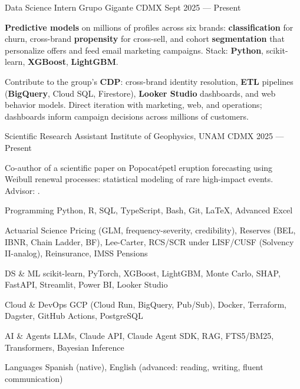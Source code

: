\documentclass[10pt, letterpaper]{awesome-cv}
\begin{document}
\begin{cventries}

  \cventry
    {Data Science Intern}
    {Grupo Gigante}
    {CDMX}
    {Sept 2025 — Present}
    {
      \begin{cvitems}
        \item {\textbf{Predictive models} on millions of profiles across six brands: \textbf{classification} for churn, cross-brand \textbf{propensity} for cross-sell, and cohort \textbf{segmentation} that personalize offers and feed email marketing campaigns. Stack: \textbf{Python}, scikit-learn, \textbf{XGBoost}, \textbf{LightGBM}.}
        \item {Contribute to the group's \textbf{CDP}: cross-brand identity resolution, \textbf{ETL} pipelines (\textbf{BigQuery}, Cloud SQL, Firestore), \textbf{Looker Studio} dashboards, and web behavior models. Direct iteration with marketing, web, and operations; dashboards inform campaign decisions across millions of customers.}
      \end{cvitems}
    }

  \cventry
    {Scientific Research Assistant }
    {Institute of Geophysics, UNAM}
    {CDMX}
    {2025 — Present}
    {
      \begin{cvitems}
        \item {Co-author of a scientific paper on Popocatépetl eruption forecasting using Weibull renewal processes: statistical modeling of rare high-impact events. Advisor: .}
      \end{cvitems}
    }

\end{cventries}


\begin{cvskills}
  \cvskill
    {Programming}
    {Python, R, SQL, TypeScript, Bash, Git, \LaTeX, Advanced Excel}

  \cvskill
    {Actuarial Science}
    {Pricing (GLM, frequency-severity, credibility), Reserves (BEL, IBNR, Chain Ladder, BF), Lee-Carter, RCS/SCR under LISF/CUSF (Solvency II-analog), Reinsurance, IMSS Pensions}

  \cvskill
    {DS \& ML}
    {scikit-learn, PyTorch, XGBoost, LightGBM, Monte Carlo, SHAP, FastAPI, Streamlit, Power BI, Looker Studio}

  \cvskill
    {Cloud \& DevOps}
    {GCP (Cloud Run, BigQuery, Pub/Sub), Docker, Terraform, Dagster, GitHub Actions, PostgreSQL}

  \cvskill
    {AI \& Agents}
    {LLMs, Claude API, Claude Agent SDK, RAG, FTS5/BM25, Transformers, Bayesian Inference}

  \cvskill
    {Languages}
    {Spanish (native), English (advanced: reading, writing, fluent communication)}
\end{cvskills}
\end{document}
